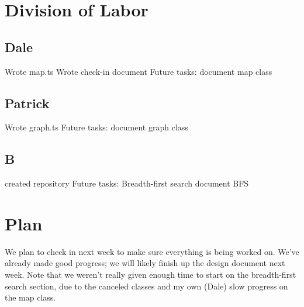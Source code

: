 \documentclass[11pt]{article}
\date{\today}
\title{}
\begin{document}
\tableofcontents

\section{Division of Labor}
\label{sec:org42fbd5f}
\subsection{Dale}
\label{sec:org66e4b27}
Wrote map.ts
Wrote check-in document
Future tasks:
document map class
\subsection{Patrick}
\label{sec:orga93d2d4}
Wrote graph.ts
Future tasks:
document graph class
\subsection{B}
\label{sec:org526b964}
created repository
Future tasks:
Breadth-first search
document BFS
\section{Plan}
\label{sec:orgc2ecd9c}
We plan to check in next week to make sure everything is being worked on.
We've already made good progress; we will likely finish up the design document next week.
Note that we weren't really given enough time to start on the breadth-first search section, due to the canceled classes and my own (Dale) slow progress on the map class.
\end{document}
